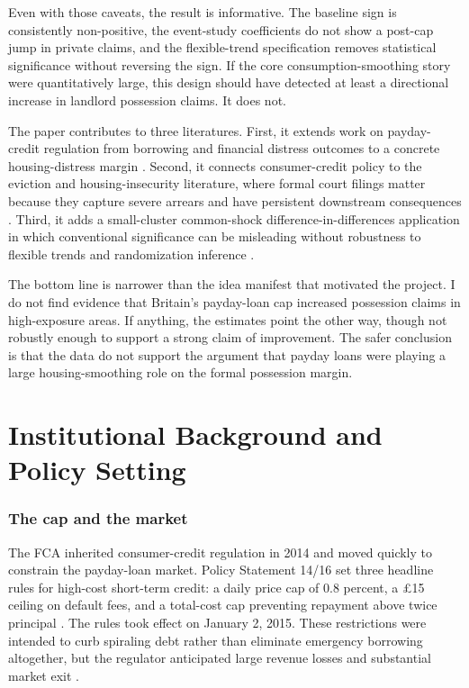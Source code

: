 \documentclass[12pt]{article}
\begin{document}
Even with those caveats, the result is informative. The baseline sign is consistently non-positive, the event-study coefficients do not show a post-cap jump in private claims, and the flexible-trend specification removes statistical significance without reversing the sign. If the core consumption-smoothing story were quantitatively large, this design should have detected at least a directional increase in landlord possession claims. It does not.

The paper contributes to three literatures. First, it extends work on payday-credit regulation from borrowing and financial distress outcomes to a concrete housing-distress margin \citep{zinman2010, morse2011, melzer2011, bhutta2014, bhutta2015, stegman2007}. Second, it connects consumer-credit policy to the eviction and housing-insecurity literature, where formal court filings matter because they capture severe arrears and have persistent downstream consequences \citep{desmond2016evicted, ambrose2015eviction, humphries2023eviction}. Third, it adds a small-cluster common-shock difference-in-differences application in which conventional significance can be misleading without robustness to flexible trends and randomization inference \citep{bertrand2004much, conley2011inference, cameron2008bootstrap, ferman2019inference, mackinnon2022cluster, roth2023whats, rambachan2023more}.

The bottom line is narrower than the idea manifest that motivated the project. I do not find evidence that Britain's payday-loan cap increased possession claims in high-exposure areas. If anything, the estimates point the other way, though not robustly enough to support a strong claim of improvement. The safer conclusion is that the data do not support the argument that payday loans were playing a large housing-smoothing role on the formal possession margin.

\section{Institutional Background and Policy Setting}

\subsubsection*{The cap and the market}
The FCA inherited consumer-credit regulation in 2014 and moved quickly to constrain the payday-loan market. Policy Statement 14/16 set three headline rules for high-cost short-term credit: a daily price cap of 0.8 percent, a \pounds 15 ceiling on default fees, and a total-cost cap preventing repayment above twice principal \citep{fca2014ps}. The rules took effect on January 2, 2015. These restrictions were intended to curb spiraling debt rather than eliminate emergency borrowing altogether, but the regulator anticipated large revenue losses and substantial market exit \citep{fca2014press, fca2017review}.
\end{document}

